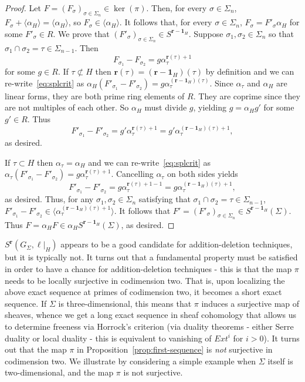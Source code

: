 \documentclass[11pt, reqno]{amsart}
\newcommand{\br}{\mathbf{r}}
\theoremstyle{definition}
\theoremstyle{remark}
\numberwithin{equation}{section}
\begin{document}
\begin{proof}
Let $F=(F_\sigma)_{\sigma\in\Sigma_n}\in\ker(\pi)$.  Then, for every $\sigma\in\Sigma_{n}$, $F_\sigma+\langle \alpha_H\rangle=\langle\alpha_H\rangle$, so $F_\sigma\in\langle \alpha_H\rangle$.  It follows that, for every $\sigma\in\Sigma_{n}$, $F_{\sigma}=F'_{\sigma}\alpha_H$ for some $F'_{\sigma}\in R$.  We prove that $(F'_\sigma)_{\sigma\in\Sigma_n}\in S^{\br-\mathbf{1}_H}$.  Suppose $\sigma_1,\sigma_2\in\Sigma_n$ so that $\sigma_1\cap\sigma_2=\tau\in\Sigma_{n-1}$.  Then
\begin{equation}\label{eq:splcrit}
F_{\sigma_1}-F_{\sigma_2}=g\alpha_{\tau}^{\br(\tau)+1}
\end{equation}
for some $g\in R$.  If $\tau\not\subset H$ then $\br(\tau)=(\br-\mathbf{1}_H)(\tau)$ by definition and we can re-write~\eqref{eq:splcrit} as $\alpha_H(F'_{\sigma_1}-F'_{\sigma_2})=g\alpha_{\tau}^{(\br-\mathbf{1}_H)(\tau)}$.  Since $\alpha_{\tau}$ and $\alpha_H$ are linear forms, they are both prime ring elements of $R$.  They are coprime since they are not multiples of each other.  So $\alpha_H$ must divide $g$, yielding $g=\alpha_Hg'$ for some $g'\in R$.  Thus
\[
F'_{\sigma_1}-F'_{\sigma_2}=g'\alpha_{\tau}^{\br(\tau)+1}=g'\alpha_{\tau}^{(\br-\mathbf{1}_H)(\tau)+1},
\]
as desired.

If $\tau\subset H$ then $\alpha_\tau=\alpha_H$ and we can re-write~\eqref{eq:splcrit} as $\alpha_\tau(F'_{\sigma_1}-F'_{\sigma_2})=g\alpha_{\tau}^{\br(\tau)+1}$.  Cancelling $\alpha_\tau$ on both sides yields
\[
F'_{\sigma_1}-F'_{\sigma_2}=g\alpha_{\tau}^{\br(\tau)+1-1}=g\alpha_{\tau}^{(\br-\mathbf{1}_H)(\tau)+1},
\]
as desired.  Thus, for any $\sigma_1,\sigma_2\in\Sigma_{n}$ satisfying that $\sigma_1\cap\sigma_2=\tau\in\Sigma_{n-1}$, $F'_{\sigma_1}-F'_{\sigma_2}\in\langle \alpha_\tau^{(\br-\mathbf{1}_{H})(\tau)+1} \rangle$.  It follows that $F'=(F'_\sigma)_{\sigma\in\Sigma_n}\in S^{\br-\mathbf{1}_H}(\Sigma)$.  Thus $F=\alpha_HF\in \alpha_HS^{\br-\mathbf{1}_H}(\Sigma)$, as desired.
\end{proof}

$S^{\br}(G_{\Sigma},\ell|_H)$ appears to be a good candidate for addition-deletion techniques, but it is typically not.  It turns out that a fundamental property must be satisfied in order to have a chance for addition-deletion techniques - this is that the map $\pi$ needs to be locally surjective in codimension two.  That is, upon localizing the above exact sequence at primes of codimension two, it becomes a short exact sequence.  If $\Sigma$ is three-dimensional, this means that $\pi$ induces a surjective map of sheaves, whence we get a long exact sequence in sheaf cohomology that allows us to determine freeness via Horrock's criterion (via duality theorems - either Serre duality or local duality - this is equivalent to vanishing of $Ext^i$ for $i>0$).  It turns out that the map $\pi$ in Proposition~\ref{prop:first-sequence} is \textit{not} surjective in codimension two.  We illustrate by considering a simple example when $\Sigma$ itself is two-dimensional, and the map $\pi$ is not surjective.
\end{document}
